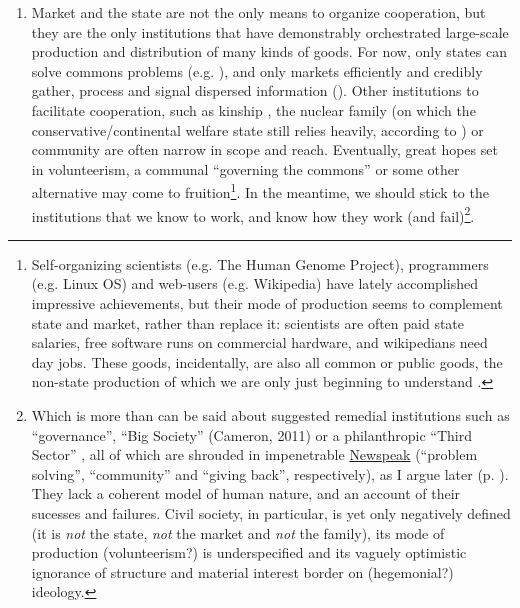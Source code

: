 \documentclass[11pt,a4paper,oneside,openright]{article}
\begin{document}
\begin{enumerate}
	\begin{enumerate} 
		\item Market and the state are not the only means to organize cooperation, but they are the only institutions that have demonstrably orchestrated large-scale production and distribution of many kinds of goods. For now, only states can solve commons problems (e.g. \citealt{Hardin-1968-aa}), and only markets efficiently and credibly gather, process and signal dispersed information (\citealt{Hayek1931}). Other institutions to facilitate cooperation, such as kinship \citep{Van-den-Berghe-1981-aa,Hammond2006}, the nuclear family (on which the conservative/continental welfare state still relies heavily, according to \citealt{Esping-Andersen-1990-aa}) or community \citep{Ostrom1990} are often narrow in scope and reach. Eventually, great hopes set in volunteerism, a communal ``governing the commons'' \citep{Ostrom1990} or some other alternative may come to fruition\footnote
			{Self-organizing scientists (e.g. The Human Genome Project), programmers (e.g. Linux OS) and web-users (e.g. Wikipedia) have lately accomplished impressive achievements, but their mode of production seems to complement state and market, rather than replace it: scientists are often paid state salaries, free software runs on commercial hardware, and wikipedians need day jobs. These goods, incidentally, are also all common or public goods, the non-state production of which we are only just beginning to understand \citep{Ostrom1990}.}. 
		In the meantime, we should stick to the institutions that we know to work, and know how they work (and fail)\footnote
			{Which is more than can be said about suggested remedial institutions such as ``governance'', ``Big Society'' (Cameron, 2011) or a philanthropic ``Third Sector'' \citep{Anheier2002}, all of which are shrouded in impenetrable \hyperref[sec:newspeak]{Newspeak} (``problem solving'', ``community'' and ``giving back'', respectively), as I argue later (p. \pageref{sec:newspeak}). They lack a coherent model of human nature, and an account of their sucesses and failures. Civil society, in particular, is yet only negatively defined (it is \emph{not} the state, \emph{not} the market and \emph{not} the family), its mode of production (volunteerism?) is underspecified and its vaguely optimistic ignorance of structure and material interest border on (hegemonial?) ideology.}.
			

\end{enumerate}
\end{enumerate}
\end{document}
